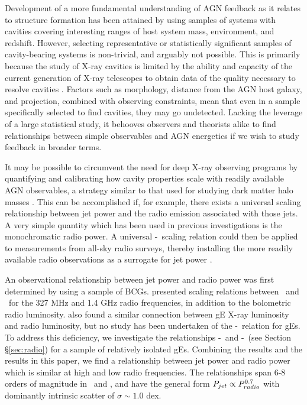 \documentclass{emulateapj}
\begin{document}
Development of a more fundamental understanding of AGN feedback as it
relates to structure formation has been attained by using samples of
systems with cavities covering interesting ranges of host system mass,
environment, and redshift. However, selecting representative or
statistically significant samples of cavity-bearing systems is
non-trivial, and arguably not possible. This is primarily because the
study of X-ray cavities is limited by the ability and capacity of the
current generation of X-ray telescopes to obtain data of the quality
necessary to resolve cavities \citep{2009arXiv0909.0397B}. Factors
such as morphology, distance from the AGN host galaxy, and projection,
combined with observing constraints, mean that even in a sample
specifically selected to find cavities, they may go
undetected. Lacking the leverage of a large statistical study, it
behooves observers and theorists alike to find relationships between
simple observables and AGN energetics if we wish to study feedback in
broader terms.

It may be possible to circumvent the need for deep X-ray observing
programs by quantifying and calibrating how cavity properties scale
with readily available AGN observables, a strategy similar to that
used for studying dark matter halo masses \citep[\eg][]{kravtsov06,
2007ApJ...668..772M, 2009A&A...498..361P}. This can be accomplished
if, for example, there exists a universal scaling relationship between
jet power and the radio emission associated with those jets. A very
simple quantity which has been used in previous investigations is the
monochromatic radio power. A universal \pjet-\prad\ scaling relation
could then be applied to measurements from all-sky radio surveys,
thereby installing the more readily available radio observations as a
surrogate for jet power \citep{croton06, 2006MNRAS.366..397S}.

An observational relationship between jet power and radio power was
first determined by \citet{birzan04, birzan08} using a sample of
BCGs. \citet{birzan04, birzan08} presented scaling relations between
\pjet\ and \prad\ for the 327 MHz and 1.4 GHz radio frequencies, in
addition to the bolometric radio
luminosity. \citet{2008ApJ...680..897D} also found a similar
connection between gE X-ray luminosity and radio luminosity, but no
study has been undertaken of the \pjet-\prad\ relation for gEs. To
address this deficiency, we investigate the relationships
\pjet-\phigh\ and \pjet-\plow\ (see Section \S\ref{sec:radio}) for a
sample of relatively isolated gEs. Combining the \citet{birzan08}
results and the results in this paper, we find a relationship between
jet power and radio power which is similar at high and low radio
frequencies. The relationships span 6-8 orders of magnitude in
\pjet\ and \prad, and have the general form $P_{jet} \propto
P_{radio}^{0.7}$ with dominantly intrinsic scatter of $\sigma \sim 1.0$
dex.
\end{document}
